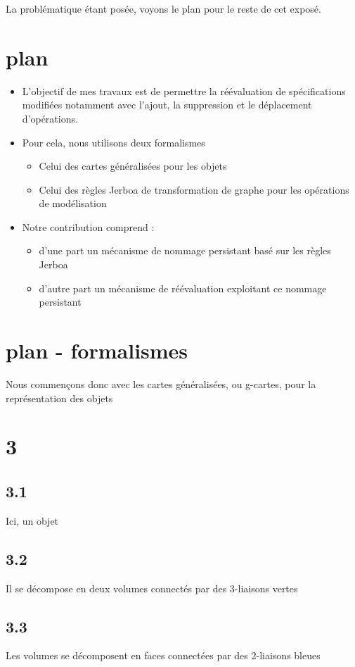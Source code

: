 \documentclass[11pt]{article}
\begin{document}
La problématique étant posée, voyons le plan pour le reste de cet exposé.
\section{plan}
\label{sec:org1bf38be}
\begin{itemize}
\item L'objectif de mes travaux est de permettre la réévaluation de spécifications
modifiées notamment avec l'ajout, la suppression et le déplacement
d'opérations.
\item Pour cela, nous utilisons deux formalismes
\begin{itemize}
\item Celui des cartes généralisées pour les objets
\item Celui des règles Jerboa de transformation de graphe pour les opérations de modélisation
\end{itemize}
\item Notre contribution comprend :
\begin{itemize}
\item d'une part un mécanisme de nommage persistant basé sur les règles Jerboa
\item d'autre part un mécanisme de réévaluation exploitant ce nommage persistant
\end{itemize}
\end{itemize}
\section{plan - formalismes}
\label{sec:org970e123}

Nous commençons donc avec les cartes généralisées, ou g-cartes, pour la
représentation des objets
\section{3}
\label{sec:orgceda85a}
\subsection{3.1}
\label{sec:orge972faa}
Ici, un objet
\subsection{3.2}
\label{sec:orgd5e9218}
Il se décompose en deux volumes connectés par des 3-liaisons vertes
\subsection{3.3}
\label{sec:org1811a01}
Les volumes se décomposent en faces connectées par des 2-liaisons
bleues
\end{document}
